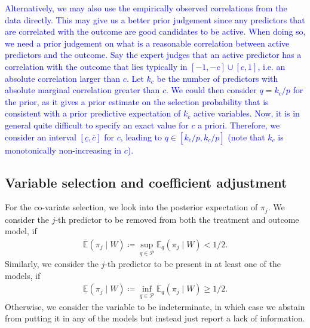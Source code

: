 \documentclass[preprint,12pt]{elsarticle}
\newcommand{\lexp}{\underline{\mathbb{E}}}
\newcommand{\uexp}{\overline{\mathbb{E}}}
\newcommand{\added}[1]{\textcolor{blue}{#1}}
\begin{document}
\added{%
Alternatively, we may also use the empirically observed correlations from the data directly.
This may give us a better prior judgement since any predictors that are correlated with the outcome are good candidates to be active.
When doing so, we need
a prior judgement on what is a reasonable
correlation between active predictors and the outcome.
Say the expert judges that
an active predictor has a correlation with the outcome
that lies typically in $[-1,-c]\cup[c,1]$, i.e.
an absolute correlation larger than $c$.
Let $k_c$ be the number of predictors with absolute marginal correlation greater than $c$.
We could then consider $q=k_c/p$ for the prior, as it gives a prior estimate on the selection probability that is consistent with a prior predictive expectation of $k_c$ active variables.
Now, it is in general quite difficult to specify an exact value for $c$ a priori.
Therefore, we consider an interval $[\underline{c},\overline{c}]$ for $c$, leading to
$q\in \left[k_{\overline{c}}/p, k_{\underline{c}}/p\right]$
(note that $k_c$ is monotonically non-increasing in $c$).
}

\subsection{Variable selection and coefficient adjustment}
For the co-variate selection, we look into the posterior expectation of $\pi_j$. 
We consider the $j$-th predictor to be removed from both the
treatment and outcome model, if
\begin{align}\label{eq:vs:remove}
	\uexp (\pi_j\mid W)\coloneqq \sup_{q\in \mathcal{P}} \mathbb{E}_q(\pi_j\mid W) < 1/2.
\end{align}
Similarly, we consider the $j$-th predictor to be present in at least one of the models, if
\begin{align}\label{eq:vs:sel}
	\lexp (\pi_j\mid W)\coloneqq \inf_{q\in \mathcal{P}} \mathbb{E}_q(\pi_j\mid W) \ge 1/2.
\end{align}
Otherwise, we consider the variable to be indeterminate,  in which case we abstain from putting
it in any of the models but instead just report a lack of information.
\end{document}
